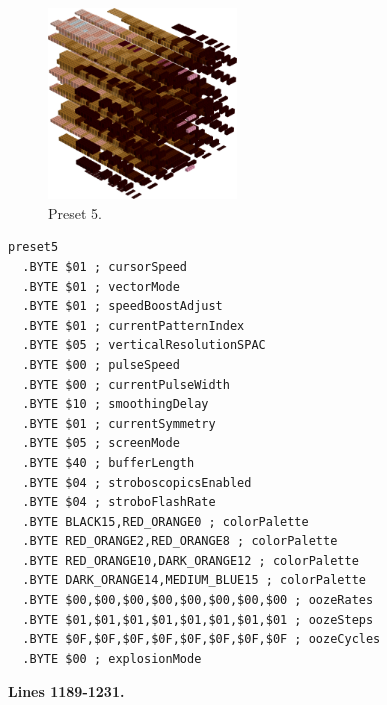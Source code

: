 \vspace*{-0.5cm}
\begin{minipage}[b]{0.48\linewidth}
\begin{figure}[H]                                                          
  \centering                                                             
  \begin{adjustbox}{width=5cm,center}                                   
  \includegraphics[width=5cm]{src/colorspace_presets/preset5-45.png}%
  \end{adjustbox}                                                        
\caption*{Preset 5.}                                           
\end{figure}                                                               
\end{minipage}
\hspace{0.1cm}
\begin{minipage}[b]{0.48\linewidth}                                                                         
\begin{lstlisting}[basicstyle=\ttfamily\tiny]
preset5
  .BYTE $01 ; cursorSpeed
  .BYTE $01 ; vectorMode
  .BYTE $01 ; speedBoostAdjust
  .BYTE $01 ; currentPatternIndex
  .BYTE $05 ; verticalResolutionSPAC
  .BYTE $00 ; pulseSpeed
  .BYTE $00 ; currentPulseWidth
  .BYTE $10 ; smoothingDelay
  .BYTE $01 ; currentSymmetry
  .BYTE $05 ; screenMode
  .BYTE $40 ; bufferLength
  .BYTE $04 ; stroboscopicsEnabled
  .BYTE $04 ; stroboFlashRate
  .BYTE BLACK15,RED_ORANGE0 ; colorPalette
  .BYTE RED_ORANGE2,RED_ORANGE8 ; colorPalette
  .BYTE RED_ORANGE10,DARK_ORANGE12 ; colorPalette
  .BYTE DARK_ORANGE14,MEDIUM_BLUE15 ; colorPalette
  .BYTE $00,$00,$00,$00,$00,$00,$00,$00 ; oozeRates
  .BYTE $01,$01,$01,$01,$01,$01,$01,$01 ; oozeSteps
  .BYTE $0F,$0F,$0F,$0F,$0F,$0F,$0F,$0F ; oozeCycles
  .BYTE $00 ; explosionMode
\end{lstlisting}
\end{minipage}
\clearpage
\textbf{Lines 1189-1231. } 
